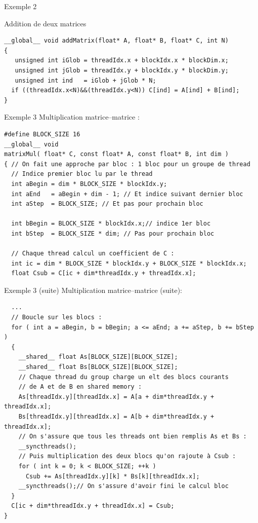 \documentclass[handout,francais]{beamer}
\begin{document}
\begin{frame}[containsverbatim]{Exemple 2}

\begin{block}{Addition de deux matrices}
\begin{lstlisting}
__global__ void addMatrix(float* A, float* B, float* C, int N) 
{
   unsigned int iGlob = threadIdx.x + blockIdx.x * blockDim.x;
   unsigned int jGlob = threadIdx.y + blockIdx.y * blockDim.y;
   unsigned int ind   = iGlob + jGlob * N;
  if ((threadIdx.x<N)&&(threadIdx.y<N)) C[ind] = A[ind] + B[ind];
}
\end{lstlisting}
\end{block}
\end{frame}

\begin{frame}[fragile]{Exemple 3}
 Multiplication matrice--matrice :
\begin{lstlisting}
#define BLOCK_SIZE 16
__global__ void
matrixMul( float* C, const float* A, const float* B, int dim )
{ // On fait une approche par bloc : 1 bloc pour un groupe de thread
  // Indice premier bloc lu par le thread
  int aBegin = dim * BLOCK_SIZE * blockIdx.y;
  int aEnd   = aBegin + dim - 1; // Et indice suivant dernier bloc
  int aStep  = BLOCK_SIZE; // Et pas pour prochain bloc
  
  int bBegin = BLOCK_SIZE * blockIdx.x;// indice 1er bloc
  int bStep  = BLOCK_SIZE * dim; // Pas pour prochain bloc
  
  // Chaque thread calcul un coefficient de C :
  int ic = dim * BLOCK_SIZE * blockIdx.y + BLOCK_SIZE * blockIdx.x;
  float Csub = C[ic + dim*threadIdx.y + threadIdx.x];
\end{lstlisting}
\end{frame}

\begin{frame}[fragile]{Exemple 3 (suite)}
 Multiplication matrice--matrice (suite):
\begin{lstlisting}
  ...
  // Boucle sur les blocs :
  for ( int a = aBegin, b = bBegin; a <= aEnd; a += aStep, b += bStep ) 
  {
    __shared__ float As[BLOCK_SIZE][BLOCK_SIZE];
    __shared__ float Bs[BLOCK_SIZE][BLOCK_SIZE];
    // Chaque thread du group charge un elt des blocs courants
    // de A et de B en shared memory :
    As[threadIdx.y][threadIdx.x] = A[a + dim*threadIdx.y + threadIdx.x];
    Bs[threadIdx.y][threadIdx.x] = A[b + dim*threadIdx.y + threadIdx.x];
    // On s'assure que tous les threads ont bien remplis As et Bs :
    __syncthreads();
    // Puis multiplication des deux blocs qu'on rajoute à Csub :
    for ( int k = 0; k < BLOCK_SIZE; ++k )
      Csub += As[threadIdx.y][k] * Bs[k][threadIdx.x];
    __syncthreads();// On s'assure d'avoir fini le calcul bloc
  }
  C[ic + dim*threadIdx.y + threadIdx.x] = Csub;
}
\end{lstlisting}
\end{frame}
\end{document}
